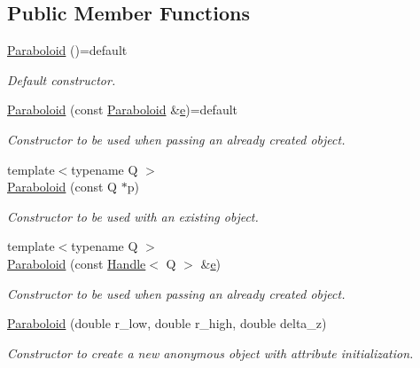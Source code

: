\subsection*{Public Member Functions}
\begin{DoxyCompactItemize}
\item 
\hyperlink{class_d_d4hep_1_1_geometry_1_1_paraboloid_ad82197282fd43403bb5c6d797cddac5f}{Paraboloid} ()=default
\begin{DoxyCompactList}\small\item\em Default constructor. \end{DoxyCompactList}\item 
\hyperlink{class_d_d4hep_1_1_geometry_1_1_paraboloid_ae56bf16dff6d8b454b40f498b78572ec}{Paraboloid} (const \hyperlink{class_d_d4hep_1_1_geometry_1_1_paraboloid}{Paraboloid} \&\hyperlink{_volumes_8cpp_a8a9a1f93e9b09afccaec215310e64142}{e})=default
\begin{DoxyCompactList}\small\item\em Constructor to be used when passing an already created object. \end{DoxyCompactList}\item 
{\footnotesize template$<$typename Q $>$ }\\\hyperlink{class_d_d4hep_1_1_geometry_1_1_paraboloid_a689f3a7fd9a1e3b0dd59c654e0997471}{Paraboloid} (const Q $\ast$p)
\begin{DoxyCompactList}\small\item\em Constructor to be used with an existing object. \end{DoxyCompactList}\item 
{\footnotesize template$<$typename Q $>$ }\\\hyperlink{class_d_d4hep_1_1_geometry_1_1_paraboloid_abcee00ef3c24c33cf39c943475e636cf}{Paraboloid} (const \hyperlink{class_d_d4hep_1_1_handle}{Handle}$<$ Q $>$ \&\hyperlink{_volumes_8cpp_a8a9a1f93e9b09afccaec215310e64142}{e})
\begin{DoxyCompactList}\small\item\em Constructor to be used when passing an already created object. \end{DoxyCompactList}\item 
\hyperlink{class_d_d4hep_1_1_geometry_1_1_paraboloid_a5819ff6e96e1969a6e342d53e4bdc09c}{Paraboloid} (double r\+\_\+low, double r\+\_\+high, double delta\+\_\+z)
\begin{DoxyCompactList}\small\item\em Constructor to create a new anonymous object with attribute initialization. \end{DoxyCompactList}\item 

\end{DoxyCompactItemize}
